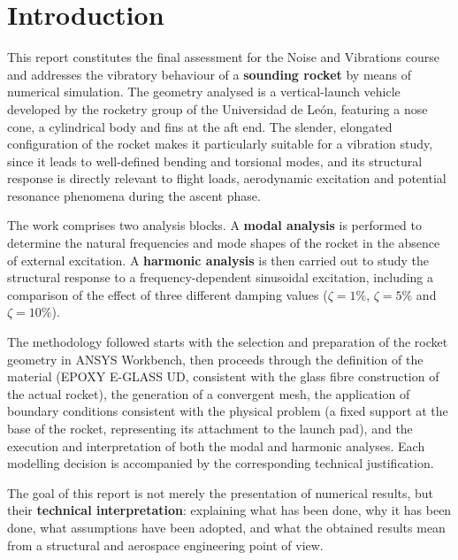 \section{Introduction}

This report constitutes the final assessment for the Noise and Vibrations course and addresses the vibratory behaviour of a \textbf{sounding rocket} by means of numerical simulation. The geometry analysed is a vertical-launch vehicle developed by the rocketry group of the Universidad de Le\'on, featuring a nose cone, a cylindrical body and fins at the aft end. The slender, elongated configuration of the rocket makes it particularly suitable for a vibration study, since it leads to well-defined bending and torsional modes, and its structural response is directly relevant to flight loads, aerodynamic excitation and potential resonance phenomena during the ascent phase.

The work comprises two analysis blocks. A \textbf{modal analysis} is performed to determine the natural frequencies and mode shapes of the rocket in the absence of external excitation. A \textbf{harmonic analysis} is then carried out to study the structural response to a frequency-dependent sinusoidal excitation, including a comparison of the effect of three different damping values ($\zeta = 1\%$, $\zeta = 5\%$ and $\zeta = 10\%$).

The methodology followed starts with the selection and preparation of the rocket geometry in ANSYS Workbench, then proceeds through the definition of the material (EPOXY E-GLASS UD, consistent with the glass fibre construction of the actual rocket), the generation of a convergent mesh, the application of boundary conditions consistent with the physical problem (a fixed support at the base of the rocket, representing its attachment to the launch pad), and the execution and interpretation of both the modal and harmonic analyses. Each modelling decision is accompanied by the corresponding technical justification.

The goal of this report is not merely the presentation of numerical results, but their \textbf{technical interpretation}: explaining what has been done, why it has been done, what assumptions have been adopted, and what the obtained results mean from a structural and aerospace engineering point of view.
